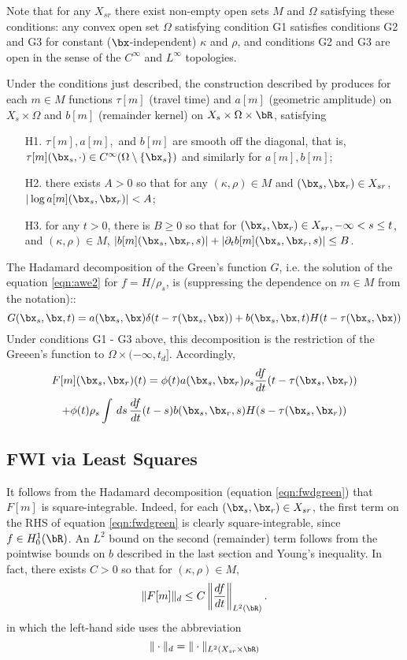 Note that for any $X_{sr}$ there exist
non-empty open sets $M$ and $\Omega$ satisfying these conditions: any convex open set
$\Omega$ satisfying condition G1 satisfies conditions G2 and G3 for constant
($\bx$-independent) $\kappa$ and $\rho$, and conditions G2 and G3 are open in
the sense of the $C^{\infty}$ and $L^{\infty}$ topologies.

Under the conditions just described, the construction described by
\cite{Friedlander:75} produces for each $m \in M$ functions $\tau[m]$ (travel time) and $a[m]$
(geometric amplitude) on $X_s \times \Omega$ and $b[m]$ (remainder kernel) on $X_s \times \Omega
\times \bR$, satisfying
\begin{itemize}
\item[H1. ] $\tau[m], a[m],$ and $b[m]$ are smooth off the diagonal,
that is, $\tau[m](\bx_s,\cdot) \in C^{\infty}(\Omega \setminus \{\bx_s\})$
and similarly for $a[m],b[m]$;
\item[H2. ] there exists $A>0$ so that for any $(\kappa,\rho) \in M$
  and $(\bx_s,\bx_r) \in X_{sr}$,
  $|\log a[m](\bx_s,\bx_r)| < A$;
\item[H3. ] for any $t>0$, there is $B\ge 0$ so that for
$(\bx_s,\bx_r) \in X_{sr}, -\infty < s \le t$, and $(\kappa,\rho) \in
M$, $|b[m](\bx_s,\bx_r,s)| +
|\partial_tb[m](\bx_s,\bx_r,s)| \le B$.
\end{itemize}

The Hadamard
decomposition of the Green's function $G$, i.e. the solution of the
equation \ref{eqn:awe2} for $f = H/\rho_s$, is (suppressing the
dependence on $m \in M$ from the notation)::
\begin{equation}
  \label{eqn:green}
  G(\bx_s,\bx,t) = a(\bx_s,\bx)\delta(t - \tau(\bx_s,\bx)) +
  b(\bx_s,\bx,t)H(t - \tau(\bx_s,\bx))
\end{equation}
Under conditions G1 - G3 above, this decomposition is the restriction of
the Greeen's function to $\Omega \times (-\infty,t_d]$. Accordingly,
\[
   F[m](\bx_s,\bx_r)(t) =
   \phi(t)a(\bx_s,\bx_r)\rho_s\frac{df}{dt}(t-\tau(\bx_s,\bx_r))
 \]
\begin{equation}
  \label{eqn:fwdgreen}
 + \phi(t)\rho_s\int
  \,ds \, \frac{df}{dt}(t-s) b(\bx_s,\bx_r,s)H(s-\tau(\bx_s,\bx_r))
\end{equation}

\subsection{FWI via Least Squares}
It follows from the Hadamard decomposition 
(equation \ref{eqn:fwdgreen}) that $F[m]$ is
square-integrable. Indeed, for each $(\bx_s,\bx_r) \in X_{sr}$, the first term on the RHS of equation \ref{eqn:fwdgreen} is clearly
square-integrable, since $f \in H^1_0(\bR)$.
An $L^2$ bound on the second (remainder) term follows from the
pointwise bounds on $b$ described in the last section and Young's
inequality. In fact, there exists $C>0$ so that for $(\kappa,\rho) \in
M$,
\begin{equation}
  \label{eqn:fwdnorm}
  \|F[m]\|_d \le C
  \left\|\frac{df}{dt}\right\|_{L^2(\bR)}.
\end{equation}
in which the left-hand side uses the abbreviation
\[
  \| \cdot \|_d = \| \cdot \|_{L^2(X_{sr} \times \bR)}
\]

